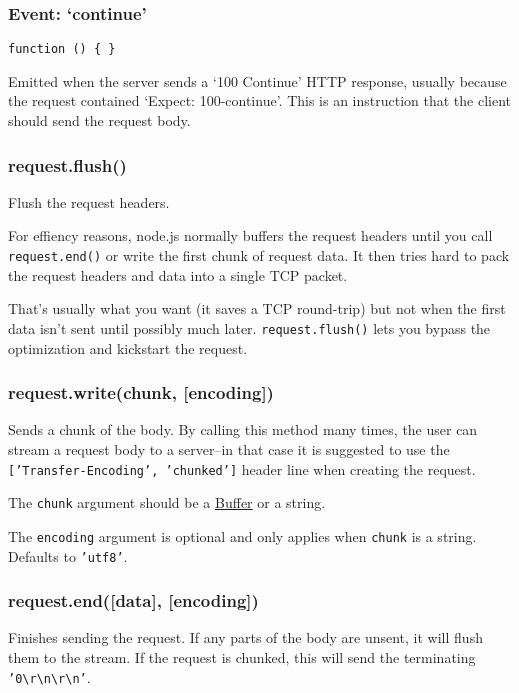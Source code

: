 \subsubsection{Event: `continue'}\label{event-continue}

\texttt{function () \{ \}}

Emitted when the server sends a `100 Continue' HTTP response, usually
because the request contained `Expect: 100-continue'. This is an
instruction that the client should send the request body.

\subsubsection{request.flush()}\label{request.flush}

Flush the request headers.

For effiency reasons, node.js normally buffers the request headers until
you call \texttt{request.end()} or write the first chunk of request
data. It then tries hard to pack the request headers and data into a
single TCP packet.

That's usually what you want (it saves a TCP round-trip) but not when
the first data isn't sent until possibly much later.
\texttt{request.flush()} lets you bypass the optimization and kickstart
the request.

\subsubsection{request.write(chunk,
{[}encoding{]})}\label{request.writechunk-encoding}

Sends a chunk of the body. By calling this method many times, the user
can stream a request body to a server--in that case it is suggested to
use the \texttt{{[}'Transfer-Encoding', 'chunked'{]}} header line when
creating the request.

The \texttt{chunk} argument should be a
\href{buffer.html\#buffer_buffer}{Buffer} or a string.

The \texttt{encoding} argument is optional and only applies when
\texttt{chunk} is a string. Defaults to \texttt{'utf8'}.

\subsubsection{request.end({[}data{]},
{[}encoding{]})}\label{request.enddata-encoding}

Finishes sending the request. If any parts of the body are unsent, it
will flush them to the stream. If the request is chunked, this will send
the terminating
\texttt{'0\textbackslash{}r\textbackslash{}n\textbackslash{}r\textbackslash{}n'}.

